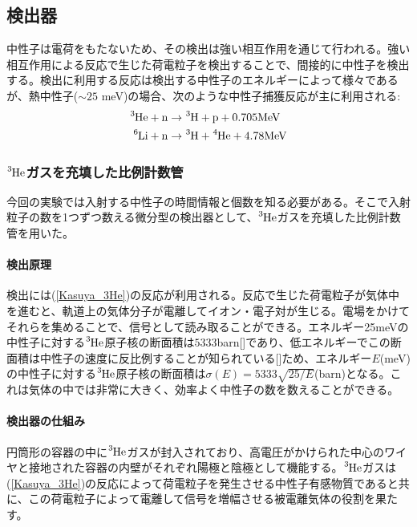 \subsection{検出器}
中性子は電荷をもたないため、その検出は強い相互作用を通じて行われる。強い相互作用による反応で生じた荷電粒子を検出することで、間接的に中性子を検出する。検出に利用する反応は検出する中性子のエネルギーによって様々であるが、熱中性子($\sim 25$ meV)の場合、次のような中性子捕獲反応が主に利用される:
\begin{align}
\ce{^3He} + \ce{n} &\to \ce{^3H}+\ce{p} + 0.705 \mathrm{MeV} \label{Kasuya_3He} \\
\ce{^6Li} + \ce{n} &\to \ce{^3H}+\ce{^4He}+4.78 \mathrm{MeV} \label{Kasuya_6Li}
\end{align}

\subsubsection{$\ce{^3He}$ガスを充填した比例計数管}
今回の実験では入射する中性子の時間情報と個数を知る必要がある。そこで入射粒子の数を1つずつ数える微分型の検出器として、$\ce{^3He}$ガスを充填した比例計数管を用いた。

\paragraph{検出原理}
検出には(\ref{Kasuya_3He})の反応が利用される。反応で生じた荷電粒子が気体中を進むと、軌道上の気体分子が電離してイオン・電子対が生じる。電場をかけてそれらを集めることで、信号として読み取ることができる。エネルギー25meVの中性子に対する$\ce{^3He}$原子核の断面積は$5333$barn[]であり、低エネルギーでこの断面積は中性子の速度に反比例することが知られている[]ため、エネルギー$E$(meV)の中性子に対する$\ce{^3He}$原子核の断面積は$\sigma(E)=5333\sqrt{25/E}$(barn)となる。これは気体の中では非常に大きく、効率よく中性子の数を数えることができる。

\paragraph{検出器の仕組み}
円筒形の容器の中に$\ce{^3He}$ガスが封入されており、高電圧がかけられた中心のワイヤと接地された容器の内壁がそれぞれ陽極と陰極として機能する。$\ce{^3He}$ガスは(\ref{Kasuya_3He})の反応によって荷電粒子を発生させる中性子有感物質であると共に、この荷電粒子によって電離して信号を増幅させる被電離気体の役割を果たす。

